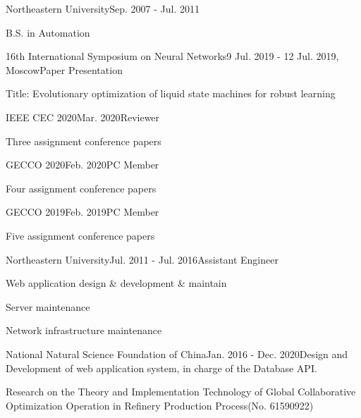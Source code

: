 \documentclass{joel_cv}
\begin{document}
\begin{sectionContentSimple}{Northeastern University}{Sep. 2007 - Jul. 2011}
	\item B.S. in Automation
\end{sectionContentSimple}


%
%


\begin{sectionContentNormal}{16th International Symposium on Neural Networks}{9 Jul. 2019 - 12 Jul. 2019, Moscow}{Paper Presentation}
	\item Title: Evolutionary optimization of liquid state machines for robust learning
\end{sectionContentNormal}

\begin{sectionContentNormal}{IEEE CEC 2020}{Mar. 2020}{Reviewer}
	\item Three assignment conference papers
\end{sectionContentNormal}

\begin{sectionContentNormal}{GECCO 2020}{Feb. 2020}{PC Member}
	\item Four assignment conference papers
\end{sectionContentNormal}

\begin{sectionContentNormal}{GECCO 2019}{Feb. 2019}{PC Member}
	\item Five assignment conference papers
\end{sectionContentNormal}



\begin{sectionContentNormal}{Northeastern University}{Jul. 2011 - Jul. 2016}{Assistant Engineer}
	\item Web application design \& development \& maintain
	\item Server maintenance
	\item Network infrastructure maintenance
\end{sectionContentNormal}


\pagebreak

%
%



\begin{sectionContentNormal}{National Natural Science Foundation of China}{Jan. 2016 - Dec. 2020}{Design and Development of web application system, in charge of the Database API.}
	\item Research on the Theory and Implementation Technology of Global Collaborative Optimization Operation in Refinery Production Process(No. 61590922)
\end{sectionContentNormal}
\end{document}
